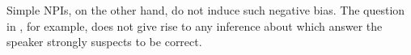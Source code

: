 \documentclass[output=paper,colorlinks,citecolor=brown]{langscibook}
\begin{document}
Simple NPIs, on the other hand, do not induce such negative bias. The question in , for example, does not give rise to any inference about which answer the speaker strongly suspects to be correct. %
\end{document}
